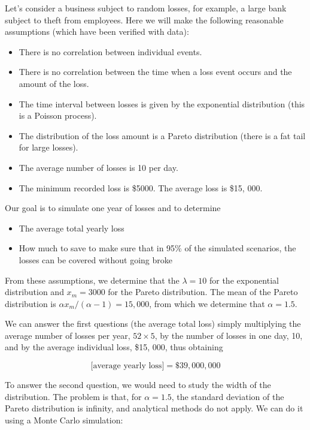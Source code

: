 \documentclass[justified, sixbynine]{tufte-book}
\theoremstyle{plain}%
\newtheorem * {corollary}{Corollary}
\theoremstyle{definition}
\theoremstyle{remark}
\newtheorem * {remark}{Remark}
\newtheorem * {note}{Note}
\begin{document}
\begin{fullwidth}
Let's consider a business subject to random losses, for example, a large bank subject to theft from employees.
Here we will make the following reasonable assumptions (which have been verified with data):
\begin{itemize}
\item There is no correlation between individual events.
\item There is no correlation between the time when a loss event occurs and the amount of the loss.
\item The time interval between losses is given by the exponential distribution (this is a Poisson process).
\item The distribution of the loss amount is a Pareto distribution (there is a fat tail for large losses).
\item The average number of losses is 10 per day.
\item The minimum recorded loss is \$5000. The average loss is \$15, 000.
\end{itemize}

Our goal is to simulate one year of losses and to determine

\begin{itemize}
\item The average total yearly loss
\item How much to save to make sure that in 95\% of the simulated scenarios, the losses can be covered without going broke
\end{itemize}

From these assumptions, we determine that the $\lambda=10$ for the exponential distribution and $x_m=3000$ for the Pareto distribution. The mean of the Pareto distribution is $\alpha x_m/(\alpha-1) = 15, 000$, from which we determine that $\alpha = 1.5$.

We can answer the first questions (the average total loss) simply multiplying the average number of losses per year, $52\times5$, by the number of losses in one day, 10, and by the average individual loss, \$15, 000, thus obtaining

\begin{equation}
\textrm{[average yearly loss]} = \$39, 000, 000
\end{equation}

To answer the second question, we would need to study the width of the distribution. The problem is that, for $\alpha=1.5$, the standard deviation of the Pareto distribution is infinity, and analytical methods do not apply. We can do it using a Monte Carlo simulation:


\end{fullwidth}
\end{document}
